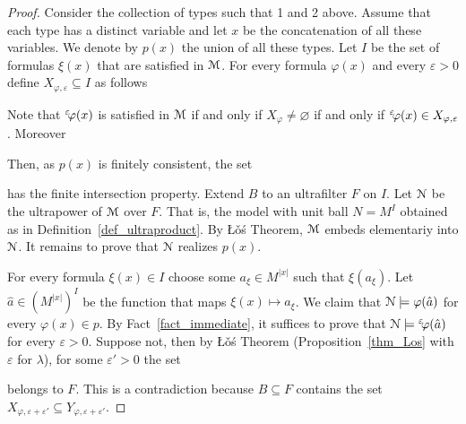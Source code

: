 \documentclass[12pt,letterpaper,oneside,reqno]{amsart}
\theoremstyle{plain}
\theoremstyle{remark}
\begin{document}
\begin{proof}
  Consider the collection of types such that 1 and 2 above.
  Assume that each type has a distinct variable and let $x$ be the concatenation of all these variables.
  We denote by $p(x)$ the union of all these types.
  Let $I$ be the set of formulas $\xi(x)$ that are satisfied in ${\EuScript M}$.
  For every formula $\varphi(x)$ and every $\varepsilon>0$ define $X_{\varphi,\varepsilon}\subseteq I$ as follows


  Note that ${}^{\varepsilon\kern-2pt}\varphi(x)$ is satisfied in ${\EuScript M}$ if and only if $X_\varphi\neq\varnothing$ if and only if ${}^{\varepsilon\kern-2pt}\varphi(x)\in X_{\varphi,\varepsilon}$.
  Moreover 
  
  
  Then, as $p(x)$ is finitely consistent, the set 
  
  
  has the finite intersection property.
  Extend $B$ to an ultrafilter $F$ on $I$.
  Let ${\EuScript N}$ be the ultrapower of ${\EuScript M}$ over $F$.
  That is, the model with unit ball $N=M^I$ obtained as in Definition~\ref{def_ultraproduct}.
  By \L\v o\'s Theorem, ${\EuScript M}$ embeds elementariy into ${\EuScript N}$.
  It remains to prove that ${\EuScript N}$ realizes $p(x)$.

  For every formula $\xi(x)\in I$ choose some $a_\xi\in  M^{|x|}$ such that $\xi(a_\xi)$.
  Let $\hat a\in (M^{|x|})^I$ be the function that maps $\xi(x)\mapsto a_\xi$.
  We claim that ${\EuScript N}\models\varphi(\hat a)$ for every $\varphi(x)\in p$.
  By Fact~\ref{fact_immediate}, it suffices to prove that ${\EuScript N}\models{}^{\varepsilon\kern-2pt}\varphi(\hat a)$ for every $\varepsilon>0$.
  Suppose not, then by \L\v o\'s Theorem (Proposition~\ref{thm_Los} with $\varepsilon$ for $\lambda$), for some $\varepsilon'>0$ the set 


  belongs to $F$.
  This is a contradiction because $B\subseteq F$ contains the set $X_{\varphi,\varepsilon+\varepsilon'}\subseteq Y_{\varphi,\varepsilon+\varepsilon'}$. 
\end{proof}
\end{document}
